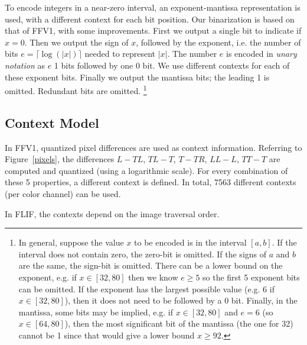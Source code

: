 \documentclass{article}
\begin{document}
To encode integers in a near-zero interval,
an exponent-mantissa representation is used, with a different context for each bit position.
Our binarization is based on that of FFV1, with some improvements.
%
First we output a single bit to indicate if $x = 0$.
Then we output the sign of $x$, followed by the exponent, i.e. the number of bits $e = \lceil \log(|x|) \rceil$ needed to
represent $|x|$. %
The number $e$ is encoded in {\em unary notation} as $e$ 1 bits followed by one 0 bit.
We use different contexts for each of these exponent bits.
Finally we output the mantissa bits; the leading 1 is omitted. %
Redundant bits are omitted.%
\footnote{
In general, suppose the value $x$ to be encoded is in the interval $[a,b]$.
If the interval does not contain zero, the zero-bit is omitted.
If the signs of $a$ and $b$ are the same, the sign-bit is omitted.
There can be a lower bound on the exponent, e.g. if $x \in [32,80]$ then
we know $e \geq 5$ so the first 5 exponent bits can be omitted. If the exponent has the largest
possible value (e.g. 6 if $x \in [32,80]$), then it does not need to be followed by a 0 bit.
Finally, in the mantissa, %
some bits may be implied,
e.g. if $x \in [32,80]$ and
$e=6$ (so $x \in [64,80]$), then the most significant bit of the mantissa
(the one for 32) cannot be 1 since that would give a lower bound $x \geq 92$.
}





\subsection{Context Model}

In FFV1, quantized pixel differences are used as context information.
Referring to Figure~\ref{pixels},
the differences $L-TL$, $TL-T$, $T-TR$, $LL-L$, $TT-T$ are computed and quantized (using
a logarithmic scale).
For every combination of these 5 properties, a different context is defined.
In total, 7563 different contexts (per color channel) can be used. %


In FLIF,
the contexts depend on the image traversal order.
\end{document}
